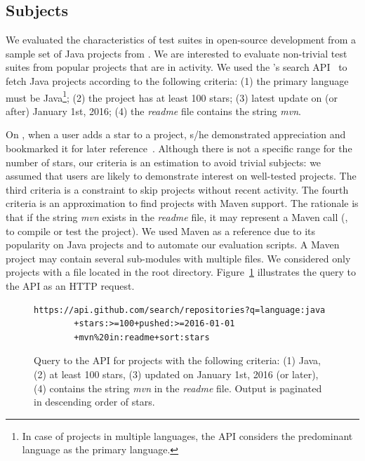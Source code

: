\subsection{Subjects}
\label{sec:subjects}

We evaluated the characteristics of test suites in open-source
development from a sample set of Java projects from \github{}.  We are
interested to evaluate non-trivial test suites from popular projects
that are in activity. We used the \github{}'s search
API~\cite{githubsearch} to fetch Java projects according to the
following criteria: (1) the primary language must be Java\footnote{In
case of projects in multiple languages, the \github{} API considers
the predominant language as the primary language.}; (2) the project
has at least 100 stars; (3) latest update on (or after) January 1st,
2016; (4) the \emph{readme} file contains the string \emph{mvn}.

On \github{}, when a user adds a star to a project, s/he demonstrated
appreciation and bookmarked it for later
reference~\cite{github-stars}.  Although there is not a specific range
for the number of stars, our criteria is an estimation to avoid
trivial subjects: we assumed that \github{} users are likely to
demonstrate interest on well-tested projects. The third criteria is a
constraint to skip projects without recent activity. The fourth
criteria is an approximation to find projects with Maven support. The
rationale is that if the string \emph{mvn} exists in the \emph{readme}
file, it may represent a Maven call (\eg, to compile or test the
project). We used Maven as a reference due to its popularity on Java
projects and to automate our evaluation scripts. A Maven project may
contain several sub-modules with multiple \pomf{} files. We considered
only projects with a \pomf{} file located in the root directory.
Figure~\ref{fig:subject-query} illustrates the query to the \github{}
API as an HTTP request.

\begin{figure}[h!]
\centering
\scriptsize
{}
\begin{lstlisting}
https://api.github.com/search/repositories?q=language:java
        +stars:>=100+pushed:>=2016-01-01
        +mvn%20in:readme+sort:stars
\end{lstlisting}
    \caption{\label{fig:subject-query} Query to the \github{} API for
    projects with the following criteria: (1) Java, (2) at least 100
    stars, (3) updated on January 1st, 2016 (or later), (4) contains
    the string \emph{mvn} in the \emph{readme} file. Output is
    paginated in descending order of stars.}
\end{figure}

